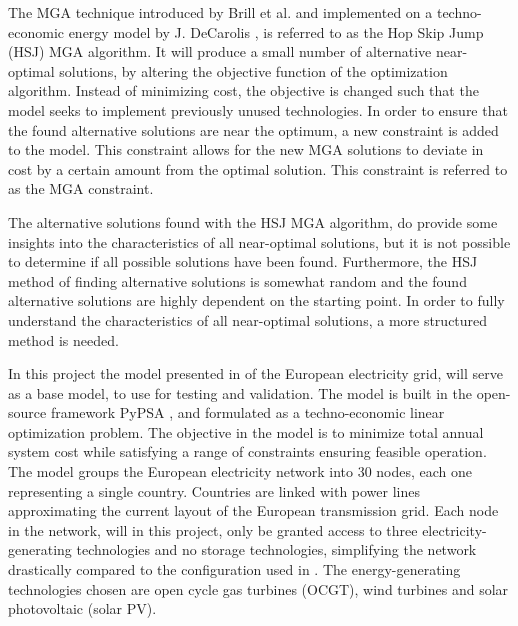 The MGA technique introduced by Brill et al. \cite{Brill_MGA_1982} and implemented on a techno-economic energy model by J. DeCarolis \cite{DeCarolis_MGA}, is referred to as the Hop Skip Jump (HSJ) MGA algorithm. It will produce a small number of alternative near-optimal solutions, by altering the objective function of the optimization algorithm. Instead of minimizing cost, the objective is changed such that the model seeks to implement previously unused technologies. In order to ensure that the found alternative solutions are near the optimum, a new constraint is added to the model. This constraint allows for the new MGA solutions to deviate in cost by a certain amount from the optimal solution. This constraint is referred to as the MGA constraint. 

The alternative solutions found with the HSJ MGA algorithm, do provide some insights into the characteristics of all near-optimal solutions, but it is not possible to determine if all possible solutions have been found. 
Furthermore, the HSJ method of finding alternative solutions is somewhat random and the found alternative solutions are highly dependent on the starting point. In order to fully understand the characteristics of all near-optimal solutions, a more structured method is needed.  


In this project the model presented in \cite{PyPSA_euro_30_model} of the European electricity grid, will serve as a base model, to use for testing and validation. The model is built in the open-source framework PyPSA \cite{Pypsa}, and formulated as a techno-economic linear optimization problem. The objective in the model is to minimize total annual system cost while satisfying a range of constraints ensuring feasible operation. The model groups the European electricity network into 30 nodes, each one representing a single country. Countries are linked with power lines approximating the current layout of the European transmission grid. Each node in the network, will in this project, only be granted access to three electricity-generating technologies and no storage technologies, simplifying the network drastically compared to the configuration used in \cite{PyPSA_euro_30_model}. The energy-generating technologies chosen are open cycle gas turbines (OCGT), wind turbines and solar photovoltaic (solar PV).



